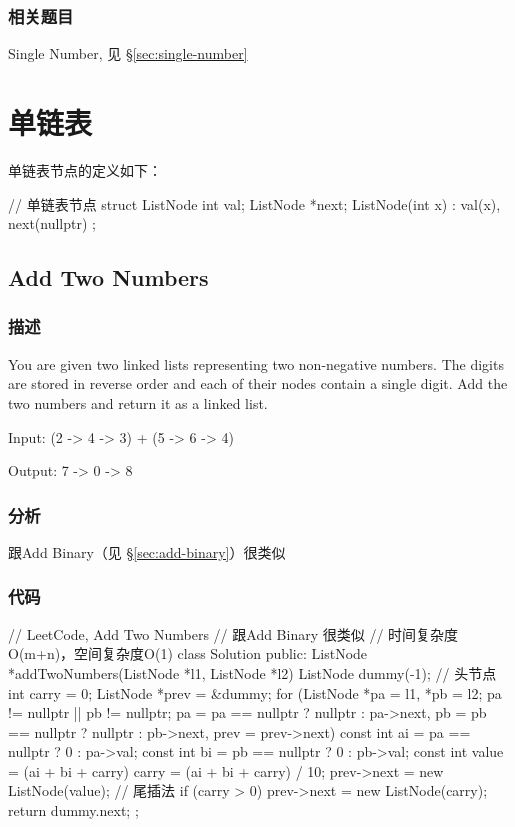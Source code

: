 \subsubsection{相关题目}
\begindot
\item  Single Number, 见 \S \ref{sec:single-number}
\myenddot


\section{单链表} %

单链表节点的定义如下：
\begin{Code}
// 单链表节点
struct ListNode {
    int val;
    ListNode *next;
    ListNode(int x) : val(x), next(nullptr) { }
};
\end{Code}


\subsection{Add Two Numbers}
\label{sec:add-two-numbers}


\subsubsection{描述}
You are given two linked lists representing two non-negative numbers. The digits are stored in reverse order and each of their nodes contain a single digit. Add the two numbers and return it as a linked list.

Input: {\small {} (2 -> 4 -> 3) + (5 -> 6 -> 4)}

Output: {\small {} 7 -> 0 -> 8}


\subsubsection{分析}
跟Add Binary（见 \S \ref{sec:add-binary}）很类似


\subsubsection{代码}
\begin{Code}
// LeetCode, Add Two Numbers
// 跟Add Binary 很类似
// 时间复杂度O(m+n)，空间复杂度O(1)
class Solution {
public:
    ListNode *addTwoNumbers(ListNode *l1, ListNode *l2) {
        ListNode dummy(-1); // 头节点
        int carry = 0;
        ListNode *prev = &dummy;
        for (ListNode *pa = l1, *pb = l2;
             pa != nullptr || pb != nullptr;
             pa = pa == nullptr ? nullptr : pa->next,
             pb = pb == nullptr ? nullptr : pb->next,
             prev = prev->next) {
            const int ai = pa == nullptr ? 0 : pa->val;
            const int bi = pb == nullptr ? 0 : pb->val;
            const int value = (ai + bi + carry) %
            carry = (ai + bi + carry) / 10;
            prev->next = new ListNode(value); // 尾插法
        }
        if (carry > 0)
            prev->next = new ListNode(carry);
        return dummy.next;
    }
};
\end{Code}


